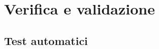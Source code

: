 \chapter{Verifica e validazione}
\label{cap:verifica-validazione}

\par 

\section{Test automatici}

